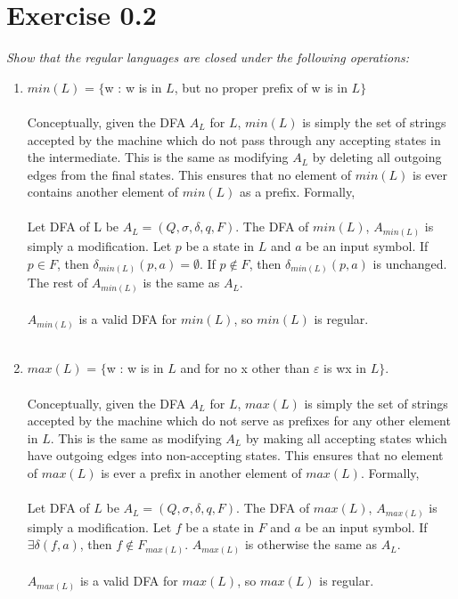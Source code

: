 \documentclass[a4paper]{article}
\begin{document}
\section{Exercise 0.2}
\emph{Show that the regular languages are closed under the following operations:}
\begin{enumerate}
\item $min(L)$ = $\{$w : w is in $L$, but no proper prefix of w is in $L\}$ \\
\\
Conceptually, given the DFA $A_{L}$ for $L$, $min(L)$ is simply the set of strings accepted by the machine which do not pass through any accepting states in the intermediate. This is the same as modifying $A_{L}$ by deleting all outgoing edges from the final states. This ensures that no element of $min(L)$ is ever contains another element of $min(L)$ as a prefix. Formally,\\
\\
Let DFA of L be $A_{L} = (Q, \sigma, \delta, q, F)$. The DFA of $min(L)$, $A_{min(L)}$ is simply a modification. Let $p$ be a state in $L$ and $a$ be an input symbol. If $p \in F$, then $\delta_{min(L)}(p, a) = \emptyset$. If $p \notin F$, then $\delta_{min(L)}(p, a)$ is unchanged. The rest of $A_{min(L)}$ is the same as $A_L$. \\
\\
$A_{min(L)}$ is a valid DFA for $min(L)$, so $min(L)$ is regular.
\\
\\



\item $max(L)$ = $\{$w : w is in $L$ and for no x other than $\varepsilon$ is wx in $L\}$. \\
\\
Conceptually, given the DFA $A_{L}$ for $L$, $max(L)$ is simply the set of strings accepted by the machine which do not serve as prefixes for any other element in $L$. This is the same as modifying $A_{L}$ by making all accepting states which have outgoing edges into non-accepting states. This ensures that no element of $max(L)$ is ever a prefix in another element of $max(L)$. Formally,\\
\\
Let DFA of $L$ be $A_{L} = (Q, \sigma, \delta, q, F)$. The DFA of $max(L)$, $A_{max(L)}$ is simply a modification. Let $f$ be a state in $F$ and $a$ be an input symbol. If $\exists \delta(f,a)$, then $f \notin F_{max(L)}$. $A_{max(L)}$ is otherwise the same as $A_{L}$. \\
\\
$A_{max(L)}$ is a valid DFA for $max(L)$, so $max(L)$ is regular.
\\
\\



\end{enumerate}
\end{document}
